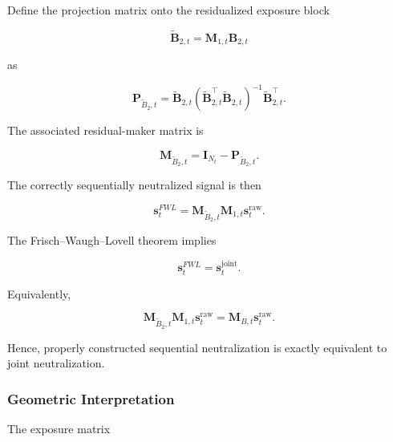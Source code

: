 \documentclass[11pt,a4paper]{article}
\begin{document}
Define the projection matrix onto the residualized exposure block

\begin{equation}
\widetilde{\mathbf{B}}_{2,t}
=
\mathbf{M}_{1,t}
\mathbf{B}_{2,t}
\end{equation}

as

\begin{equation}
\mathbf{P}_{\widetilde{B}_2,t}
=
\widetilde{\mathbf{B}}_{2,t}
\left(
\widetilde{\mathbf{B}}_{2,t}^{\top}
\widetilde{\mathbf{B}}_{2,t}
\right)^{-1}
\widetilde{\mathbf{B}}_{2,t}^{\top}.
\end{equation}

The associated residual-maker matrix is

\begin{equation}
\boxed{
\mathbf{M}_{\widetilde{B}_2,t}
=
\mathbf{I}_{N_t}
-
\mathbf{P}_{\widetilde{B}_2,t}.
}
\end{equation}

The correctly sequentially neutralized signal is then

\begin{equation}
\boxed{
\mathbf{s}_t^{FWL}
=
\mathbf{M}_{\widetilde{B}_2,t}
\mathbf{M}_{1,t}
\mathbf{s}_t^{\mathrm{raw}}.
}
\end{equation}

The Frisch--Waugh--Lovell theorem implies

\begin{equation}
\boxed{
\mathbf{s}_t^{FWL}
=
\mathbf{s}_t^{\mathrm{joint}}.
}
\end{equation}

Equivalently,

\begin{equation}
\boxed{
\mathbf{M}_{\widetilde{B}_2,t}
\mathbf{M}_{1,t}
\mathbf{s}_t^{\mathrm{raw}}
=
\mathbf{M}_{B,t}
\mathbf{s}_t^{\mathrm{raw}}.
}
\end{equation}

Hence, properly constructed sequential neutralization is exactly equivalent to
joint neutralization.


\subsubsection{Geometric Interpretation}

The exposure matrix
\end{document}
